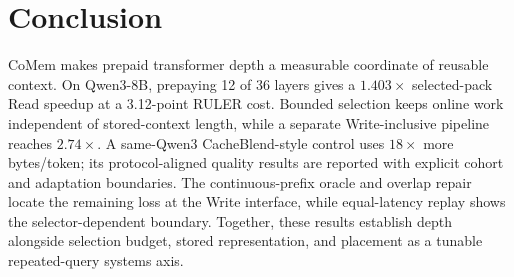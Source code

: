 \section{Conclusion}
\label{sec:conclusion}

CoMem makes prepaid transformer depth a measurable coordinate of reusable
context. On Qwen3-8B, prepaying 12 of 36 layers gives a $1.403\times$
selected-pack Read speedup at a 3.12-point RULER cost. Bounded selection keeps
online work independent of stored-context length, while a separate
Write-inclusive pipeline reaches $2.74\times$. A same-Qwen3 CacheBlend-style
control uses $18\times$ more bytes/token; its protocol-aligned quality results
are reported with explicit cohort and adaptation boundaries.
The continuous-prefix oracle and overlap repair locate the remaining loss at the
Write interface, while equal-latency replay shows the selector-dependent
boundary. Together, these results establish depth alongside selection budget,
stored representation, and placement as a tunable repeated-query systems axis.
